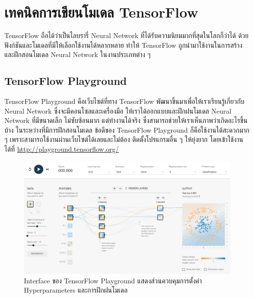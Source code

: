 

\section{เทคนิคการเขียนโมเดล TensorFlow}
\label{ap:coding_tf}

TensorFlow ถือได้ว่าเป็นไลบรารี่ Neural Network ที่ได้รับความนิยมมากที่สุดในโลกก็ว่าได้ ด้วยฟังก์ชันและโมเดลที่มีให้เลือกใช้งานได้หลากหลาย
ทำให้ TensorFlow ถูกนำมาใช้งานในการสร้างและฝึกสอนโมเดล Neural Network ในงานประเภทต่าง ๆ

\subsection{TensorFlow Playground}

TensorFlow Playground คือเว็บไซต์ที่ทาง TensorFlow พัฒนาขึ้นมาเพื่อให้เราเรียนรู้เกี่ยวกับ Neural Network ซึ่งจะมีคอนโซลและเครื่องมือ%
ให้เราได้ออกแบบและฝึกฝนโมเดล Neural Network ที่มีขนาดเล็ก ไม่ซับซ้อนมาก แต่ทำงานได้จริง ซึ่งสามารถช่วยให้เราเห็นภาพว่าเกิดอะไรขึ้นบ้าง%
ในระหว่างที่มีการฝึกสอนโมเดล ข้อดีของ TensorFlow Playground ก็คือใช้งานได้สะดวกมาก ๆ เพราะสามารถใช้งานผ่านเว็บไซต์ได้เลยและไม่ต้อง%
ติดตั้งโปรแกรมอื่น ๆ ให้ยุ่งยาก โดยเข้าใช้งานได้ที่ \url{http://playground.tensorflow.org/}

\begin{figure}[H]
    \centering
    \includegraphics[width=\linewidth]{fig/tf-playground.png}
    \caption{Interface ของ TensorFlow Playground แสดงส่วนควบคุมการตั้งค่า Hyperparameters และการฝึกฝนโมเดล}
    \label{fig:tf_playground}
\end{figure}

